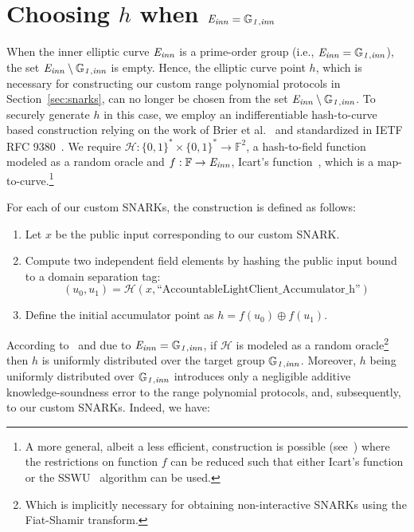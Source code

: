 \section{Choosing $h$ when $\mathit{E}_{\mathit{inn}} = \mathbb{G}_{\mathit{1,inn}}$}
\label{sec:other_choice_h}

When the inner elliptic curve $\mathit{E}_{\mathit{inn}}$ is a prime-order group (i.e., $\mathit{E}_{\mathit{inn}} = \mathbb{G}_{\mathit{1,inn}}$), 
the set $\mathit{E}_{\mathit{inn}} \setminus \mathbb{G}_{\mathit{1,inn}}$ is empty. Hence, the elliptic curve point $h$, which is 
necessary for constructing our custom range polynomial protocols in Section~\ref{sec:snarks}, can no longer be chosen from the set 
$\mathit{E}_{\mathit{inn}} \setminus \mathbb{G}_{\mathit{1,inn}}$. To securely generate $h$ in this case, we employ an indifferentiable hash-to-curve based 
construction relying on the work of Brier et al.~\cite{hash-to-curve} and standardized in IETF RFC 9380~\cite{ietf_rfc_9380}. We require 
$\mathcal{H}: \{0, 1\}^* \times \{0, 1\}^* \rightarrow \mathbb{F}^2$, a hash-to-field function modeled as a random oracle and 
$f: \mathbb{F} \rightarrow \mathit{E}_{\mathit{inn}}$, Icart's function~\cite{icart_function}, which is a map-to-curve.{\footnote{A more general, albeit a less efficient, construction is possible (see~\cite{hash-to-curve}) 
where the restrictions on function $f$ can be reduced such that either Icart's function or the SSWU~\cite{SWU} algorithm can be used.}} 

For each of our custom SNARKs, the construction is defined as follows:
\begin{enumerate}
    \item Let $x$ be the public input corresponding to our custom SNARK.    
    \item Compute two independent field elements by hashing the public input bound to a domain separation tag: 
    \[ (u_0, u_1) = \mathcal{H}(x, \text{``AccountableLightClient\_Accumulator\_h''}) \]
    \item Define the initial accumulator point as $h = f(u_0) \oplus f(u_1)$.
\end{enumerate}

According to~\cite{hash-to-curve} and due to $\mathit{E}_{\mathit{inn}} = \mathbb{G}_{\mathit{1,inn}}$, if $\mathcal{H}$ is modeled as a random 
oracle\footnote{Which is implicitly necessary for obtaining non-interactive SNARKs using the Fiat-Shamir transform.}  
then $h$ is uniformly distributed over the target group $\mathbb{G}_{\mathit{1,inn}}$. Moreover, $h$ being uniformly 
distributed over $\mathbb{G}_{\mathit{1,inn}}$ introduces only a negligible additive knowledge-soundness error to 
the range polynomial protocols, and, subsequently, to our custom SNARKs. Indeed, we have: 
 
